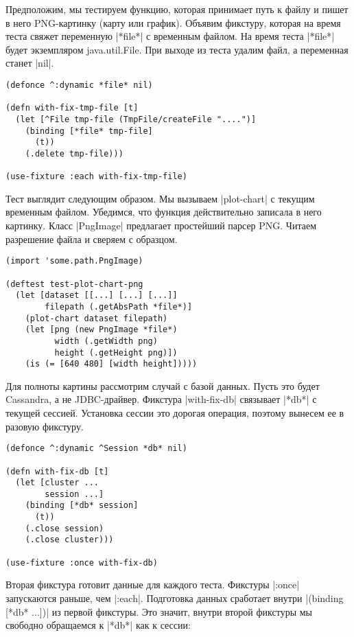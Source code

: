 Предположим, мы тестируем функцию, которая принимает путь к файлу и пишет в него
PNG-картинку (карту или график). Объявим фикстуру, которая на время теста свяжет
переменную \spverb|*file*| с временным файлом. На время теста \spverb|*file*|
будет экземпляром java.util.File. При выходе из теста удалим файл, а переменная
станет \spverb|nil|.

\begin{verbatim}
(defonce ^:dynamic *file* nil)

(defn with-fix-tmp-file [t]
  (let [^File tmp-file (TmpFile/createFile "....")]
    (binding [*file* tmp-file]
      (t))
    (.delete tmp-file)))

(use-fixture :each with-fix-tmp-file)
\end{verbatim}

Тест выглядит следующим образом. Мы вызываем \spverb|plot-chart| с текущим
временным файлом. Убедимся, что функция действительно записала в него
картинку. Класс \spverb|PngImage| предлагает простейший парсер PNG. Читаем
разрешение файла и сверяем с образцом.

\begin{verbatim}
(import 'some.path.PngImage)

(deftest test-plot-chart-png
  (let [dataset [[...] [...] [...]]
        filepath (.getAbsPath *file*)]
    (plot-chart dataset filepath)
    (let [png (new PngImage *file*)
          width (.getWidth png)
          height (.getHeight png)])
    (is (= [640 480] [width height]))))
\end{verbatim}

Для полноты картины рассмотрим случай с базой данных. Пусть это будет Cassandra,
а не JDBC-драйвер. Фикстура \spverb|with-fix-db| связывает \spverb|*db*| с
текущей сессией. Установка сессии это дорогая операция, поэтому вынесем ее в
разовую фикстуру.

\begin{verbatim}
(defonce ^:dynamic ^Session *db* nil)

(defn with-fix-db [t]
  (let [cluster ...
        session ...]
    (binding [*db* session]
      (t))
    (.close session)
    (.close cluster)))

(use-fixture :once with-fix-db)
\end{verbatim}

Вторая фикстура готовит данные для каждого теста. Фикстуры \spverb|:once|
запускаются раньше, чем \spverb|:each|. Подготовка данных сработает внутри
\spverb|(binding [*db* ...])| из первой фикстуры. Это значит, внутри второй
фикстуры мы свободно обращаемся к \spverb|*db*| как к сессии:

